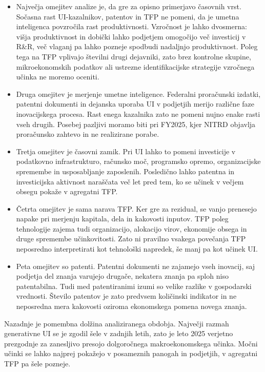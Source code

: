 \documentclass[12pt,a4paper]{article}
\begin{document}
\begin{itemize}
    \item Največja omejitev analize je, da gre za opisno primerjavo časovnih vrst. Sočasna rast UI-kazalnikov, patentov in TFP ne pomeni, da je umetna inteligenca povzročila rast produktivnosti. Vzročnost je lahko dvosmerna: višja produktivnost in dobički lahko podjetjem omogočijo več investicij v R\&R, več vlaganj pa lahko pozneje spodbudi nadaljnjo produktivnost. Poleg tega na TFP vplivajo številni drugi dejavniki, zato brez kontrolne skupine, mikroekonomskih podatkov ali ustrezne identifikacijske strategije vzročnega učinka ne moremo oceniti.

    \item Druga omejitev je merjenje umetne inteligence. Federalni proračunski izdatki, patentni dokumenti in dejanska uporaba UI v podjetjih merijo različne faze inovacijskega procesa. Rast enega kazalnika zato ne pomeni nujno enake rasti vseh drugih. Posebej pazljivi moramo biti pri FY2025, kjer NITRD objavlja proračunsko zahtevo in ne realizirane porabe.

    \item Tretja omejitev je časovni zamik. Pri UI lahko to pomeni investicije v podatkovno infrastrukturo, računsko moč, programsko opremo, organizacijske spremembe in usposabljanje zaposlenih. Posledično lahko patentna in investicijska aktivnost naraščata več let pred tem, ko se učinek v večjem obsegu pokaže v agregatni TFP.

    \item Četrta omejitev je sama narava TFP. Ker gre za rezidual, se vanjo prenesejo napake pri merjenju kapitala, dela in kakovosti inputov. TFP poleg tehnologije zajema tudi organizacijo, alokacijo virov, ekonomije obsega in druge spremembe učinkovitosti. Zato ni pravilno vsakega povečanja TFP neposredno interpretirati kot tehnološki napredek, še manj pa kot učinek UI.

    \item Peta omejitev so patenti. Patentni dokumenti ne zajamejo vseh inovacij, saj podjetja del znanja varujejo drugače, nekatera znanja pa sploh niso patentabilna. Tudi med patentiranimi izumi so velike razlike v gospodarski vrednosti. Število patentov je zato predvsem količinski indikator in ne neposredna mera kakovosti oziroma ekonomskega pomena novega znanja.
\end{itemize}
Nazadnje je pomembna dolžina analiziranega obdobja. Največji razmah generativne UI se je zgodil šele v zadnjih letih, zato je leto 2025 verjetno prezgodnje za zanesljivo presojo dolgoročnega makroekonomskega učinka. Močni učinki se lahko najprej pokažejo v posameznih panogah in podjetjih, v agregatni TFP pa šele pozneje.
\end{document}

